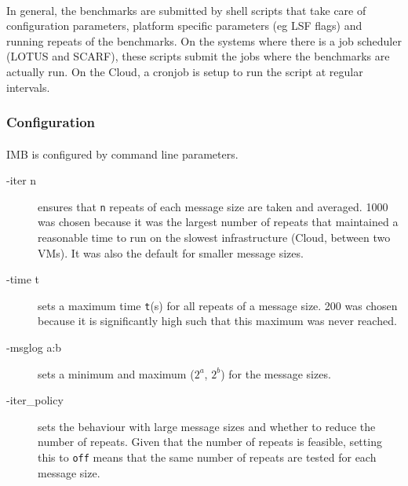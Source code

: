 \documentclass{article}
\begin{document}
        \paragraph{}
        In general, the benchmarks are submitted by shell scripts that take care of configuration parameters, platform specific parameters (eg LSF flags) and running repeats of the benchmarks. On the systems where there is a job scheduler (LOTUS and SCARF), these scripts submit the jobs where the benchmarks are actually run. On the Cloud, a cronjob is setup to run the script at regular intervals.

        \subsubsection{Configuration}

        \paragraph{}
        IMB is configured by command line parameters.

        \begin{description}
            \item[-iter n] ensures that \verb|n| repeats of each message size are taken and averaged. 1000 was chosen because it was the largest number of repeats that maintained a reasonable time to run on the slowest infrastructure (Cloud, between two VMs). It was also the default for smaller message sizes.
            \item[-time t] sets a maximum time \verb|t|(s) for all repeats of a message size. 200 was chosen because it is significantly high such that this maximum was never reached.
            \item[-msglog a:b] sets a minimum and maximum ($2^{a}$, $2^{b}$) for the message sizes.
            \item[-iter\_policy] sets the behaviour with large message sizes and whether to reduce the number of repeats. Given that the number of repeats is feasible, setting this to \verb|off| means that the same number of repeats are tested for each message size.
        \end{description}
\end{document}
